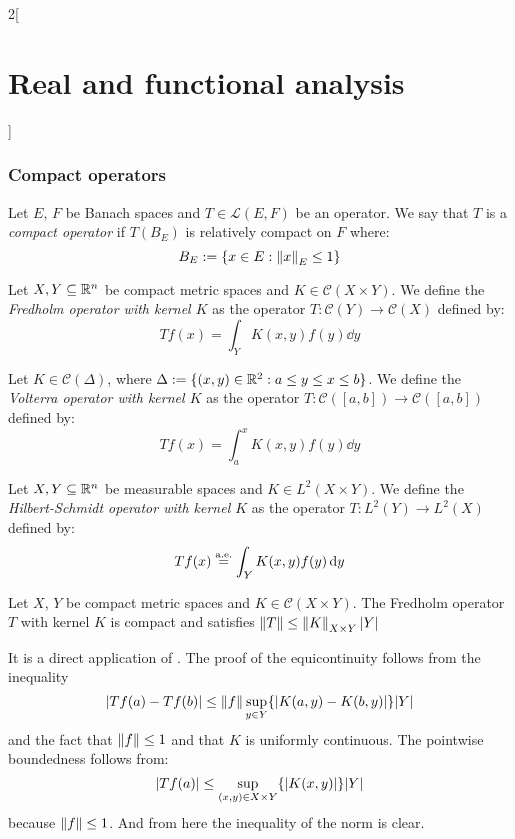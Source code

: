 \documentclass[../../../main_math.tex]{subfiles}
\begin{document}
\begin{multicols}{2}[\section{Real and functional analysis}]
  \subsubsection{Compact operators}
  \begin{definition}
    Let $E$, $F$ be Banach spaces and $T\in\mathcal{L}(E,F)$ be an operator. We say that $T$ is a \emph{compact operator} if $T(B_E)$ is relatively compact on $F$ where: $$B_E:=\{x\in E:\left\|x\right\|_E\leq 1\}$$
  \end{definition}
  \begin{definition}
    Let $X,Y\subseteq \mathbb{R}^n$ be compact metric spaces and $K\in\mathcal{C}(X\times Y)$. We define the \emph{Fredholm operator with kernel $K$} as the operator $T:\mathcal{C}(Y)\rightarrow\mathcal{C}(X)$ defined by: $$Tf(x)=\int_YK(x,y)f(y)\dd{y}$$
  \end{definition}
  \begin{definition}
    Let $K\in\mathcal{C}(\Delta)$, where $\Delta:=\{(x,y)\in\mathbb{R}^2:a\leq y\leq x\leq b\}$. We define the \emph{Volterra operator with kernel $K$} as the operator $T:\mathcal{C}([a,b])\rightarrow\mathcal{C}([a,b])$ defined by: $$Tf(x)=\int_a^xK(x,y)f(y)\dd{y}$$
  \end{definition}
  \begin{definition}
    Let $X,Y\subseteq \mathbb{R}^n$ be measurable spaces and $K\in L^2(X\times Y)$. We define the \emph{Hilbert-Schmidt operator with kernel $K$} as the operator $T:L^2(Y)\rightarrow L^2(X)$ defined by: $$Tf(x)\overset{\text{a.e.}}{=}\int_YK(x,y)f(y)\dd{y}$$
  \end{definition}
  \begin{proposition}\label{RFA:fredholm}
    Let $X$, $Y$ be compact metric spaces and $K\in\mathcal{C}(X\times Y)$. The Fredholm operator $T$ with kernel $K$ is compact and satisfies $\left\|T\right\|\leq\left\|K\right\|_{X\times Y}\abs{Y}$
  \end{proposition}
  \begin{sproof}
    It is a direct application of . The proof of the equicontinuity follows from the inequality
    $$\abs{Tf(a)-Tf(b)}\leq \left\|f\right\|\sup_{y\in Y}\{\abs{K(a,y)-K(b,y)}\}\abs{Y}$$
    and the fact that $\left\|f\right\|\leq 1$ and that $K$ is uniformly continuous. The pointwise boundedness follows from:
    $$\abs{Tf(a)}\leq\sup_{(x,y)\in X\times Y}\{\abs{K(x,y)}\}\abs{Y}$$
    because $\left\|f\right\|\leq 1$.
    And from here the inequality of the norm is clear.
  \end{sproof}
  \begin{proposition}

\end{proposition}
\end{multicols}
\end{document}
